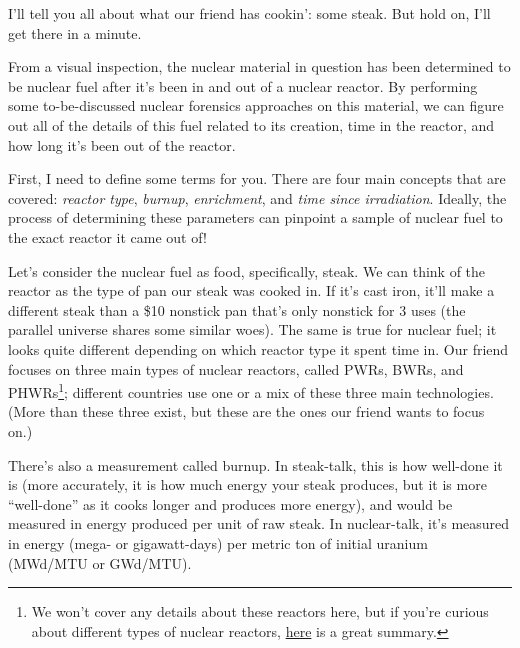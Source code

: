 {\narr I'll tell you all about what our friend has cookin': some steak. But hold
on, I'll get there in a minute.

From a visual inspection, the nuclear material in question has been determined
to be nuclear fuel after it's been in and out of a nuclear reactor. By
performing some to-be-discussed nuclear forensics approaches on this material,
we can figure out all of the details of this fuel related to its creation, time
in the reactor, and how long it's been out of the reactor. 

First, I need to define some terms for you. There are four main concepts that
are covered: \textit{reactor type}, \textit{burnup}, \textit{enrichment}, and
\textit{time since irradiation}.  Ideally, the process of determining these
parameters can pinpoint a sample of nuclear fuel to the exact reactor it came
out of!

Let's consider the nuclear fuel as food, specifically, steak. We can think of
the reactor as the type of pan our steak was cooked in. If it's cast iron,
it'll make a different steak than a \$10 nonstick pan that's only nonstick for
3 uses (the parallel universe shares some similar woes). The same is true for
nuclear fuel; it looks quite different depending on which reactor type it spent
time in. Our friend focuses on three main types of nuclear reactors, called
\glspl{PWR}, \glspl{BWR}, and \glspl{PHWR}\footnote{We won't cover any details
about these reactors here, but if you're curious about different types of
nuclear reactors,
\href{http://www.world-nuclear.org/uploadedFiles/org/WNA/Publications/Nuclear\_Information/Pocket\%20Guide\%20Reactors.pdf}{\color{blue}here}
is a great summary.}; different countries use one or a mix of these three main
technologies. (More than these three exist, but these are the ones our friend
wants to focus on.) 

There's also a measurement called burnup. In steak-talk, this is how well-done
it is (more accurately, it is how much energy your steak produces, but it is
more ``well-done'' as it cooks longer and produces more energy), and would be
measured in energy produced per unit of raw steak. In nuclear-talk, it's
measured in energy (mega- or gigawatt-days) per metric ton of initial uranium
(MWd/MTU or GWd/MTU). 

}
